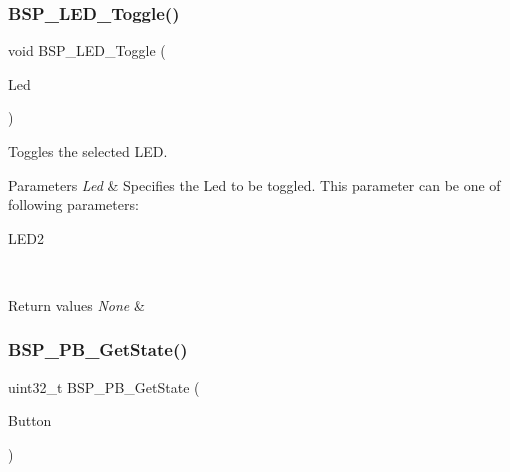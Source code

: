 \subsubsection{\texorpdfstring{B\+S\+P\+\_\+\+L\+E\+D\+\_\+\+Toggle()}{BSP\_LED\_Toggle()}}
{\footnotesize\ttfamily void B\+S\+P\+\_\+\+L\+E\+D\+\_\+\+Toggle (\begin{DoxyParamCaption}\item[{\hyperlink{group__B-L072Z-LRWAN1__LOW__LEVEL__Exported__Types_gaa059704b7ca945eb9c1e7f2c3d03fecd}{Led\+\_\+\+Type\+Def}}]{Led }\end{DoxyParamCaption})}



Toggles the selected L\+ED. 


\begin{DoxyParams}{Parameters}
{\em Led} & Specifies the Led to be toggled. This parameter can be one of following parameters\+: \begin{DoxyItemize}
\item L\+E\+D2 \end{DoxyItemize}
\\
\hline
\end{DoxyParams}

\begin{DoxyRetVals}{Return values}
{\em None} & \\
\hline
\end{DoxyRetVals}
\mbox{\label{group__B-L072Z-LRWAN1__LOW__LEVEL__Private__Defines_ga8f0978b6cffda9c67266ddfdb3a0abf7}} 
\subsubsection{\texorpdfstring{B\+S\+P\+\_\+\+P\+B\+\_\+\+Get\+State()}{BSP\_PB\_GetState()}}
{\footnotesize\ttfamily uint32\+\_\+t B\+S\+P\+\_\+\+P\+B\+\_\+\+Get\+State (\begin{DoxyParamCaption}\item[{\hyperlink{group__B-L072Z-LRWAN1__LOW__LEVEL__Exported__Types_ga643816dfbad5c734fc25a29ce8d35bb1}{Button\+\_\+\+Type\+Def}}]{Button }\end{DoxyParamCaption})}



